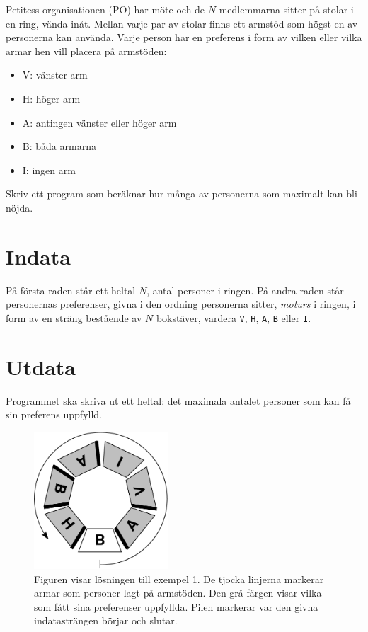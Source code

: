
Petitess-organisationen (PO) har möte och de $N$ medlemmarna sitter på
stolar i en ring, vända inåt. Mellan varje par av stolar finns ett armstöd som högst en av personerna kan använda. Varje person har en preferens i form av vilken eller vilka armar hen vill placera på armstöden:
\begin{itemize}
\item V: vänster arm
\item H: höger arm
\item A: antingen vänster eller höger arm
\item B: båda armarna
\item I: ingen arm
\end{itemize}

Skriv ett program som beräknar hur många av personerna som maximalt kan bli nöjda.

\section*{Indata}
På första raden står ett heltal $N$, antal personer i ringen. På andra raden står personernas preferenser, givna i den ordning
personerna sitter, {\em moturs} i ringen, i form av en
sträng bestående av $N$ bokstäver, vardera \texttt{V}, \texttt{H},
\texttt{A}, \texttt{B} eller \texttt{I}. 

\section*{Utdata}
Programmet ska skriva ut ett heltal: det maximala antalet personer som kan få sin preferens uppfylld.

\begin{figure}[!htb]
\begin{center}
\includegraphics[width=5cm]{armstodbild.pdf}
\end{center}
\caption{Figuren visar lösningen till exempel 1. De tjocka linjerna markerar
armar som personer lagt på armstöden. Den grå färgen visar vilka som fått sina preferenser uppfyllda. Pilen markerar var den givna
indatasträngen börjar och slutar.}
\end{figure}

